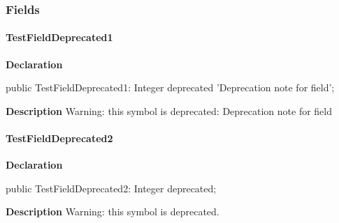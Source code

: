 \documentclass{report}
\begin{document}
\subsubsection*{\large{\textbf{Fields}}\normalsize\hspace{1ex}\hfill}
\paragraph*{TestFieldDeprecated1}\hspace*{\fill}

\begin{list}{}{
\setlength{\itemindent}{0cm}
\setlength{\listparindent}{0cm}
\setlength{\leftmargin}{\evensidemargin}
\addtolength{\leftmargin}{\tmplength}
\settowidth{\labelsep}{X}
\addtolength{\leftmargin}{\labelsep}
\setlength{\labelwidth}{\tmplength}
}
\begin{flushleft}
\item[\textbf{Declaration}\hfill]
\begin{ttfamily}
public TestFieldDeprecated1: Integer deprecated 'Deprecation note for field';\end{ttfamily}


\end{flushleft}
\par
\item[\textbf{Description}]
Warning: this symbol is deprecated: Deprecation note for field

 

\end{list}
\paragraph*{TestFieldDeprecated2}\hspace*{\fill}

\begin{list}{}{
\setlength{\itemindent}{0cm}
\setlength{\listparindent}{0cm}
\setlength{\leftmargin}{\evensidemargin}
\addtolength{\leftmargin}{\tmplength}
\settowidth{\labelsep}{X}
\addtolength{\leftmargin}{\labelsep}
\setlength{\labelwidth}{\tmplength}
}
\begin{flushleft}
\item[\textbf{Declaration}\hfill]
\begin{ttfamily}
public TestFieldDeprecated2: Integer deprecated;\end{ttfamily}


\end{flushleft}
\par
\item[\textbf{Description}]
Warning: this symbol is deprecated.

 

\end{list}
\end{document}
